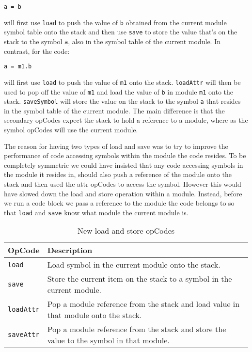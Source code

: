 \begin{lstlisting}
a = b
\end{lstlisting}

will first use {\tt load} to push the value of {\tt b} obtained from the current module symbol table onto the stack and then use {\tt save} to store the value that's on the stack to the symbol {\tt a}, also in the symbol table of the current module. In contrast, for the code:

\begin{lstlisting}
a = m1.b
\end{lstlisting}

will first use {\tt load} to push the value of {\tt m1} onto the stack. {\tt loadAttr} will then be used to pop off the value of {\tt m1} and load the value of {\tt b} in module {\tt m1} onto the stack. {\tt saveSymbol} will store the value on the stack to the symbol {\tt a} that resides in the symbol table of the current module. The main difference is that the secondary opCodes expect the stack to hold a reference to a module, where as the symbol opCodes will use the current module.

The reason for having two types of load and save was to try to improve the performance of code accessing symbols within the module the code resides. To be completely symmetric we could have insisted that any code accessing symbols in the module it resides in, should also push a reference of the module onto the stack and then used the attr opCodes to access the symbol. However this would have slowed down the load and store operation within a module. Instead, before we run a code block we pass a reference to the module the code belongs to so that {\tt load} and {\tt save} know what module the current module is.

\begin{table}
\centering
\begin{tabular}{lp{8.5cm}} \toprule
OpCode & Description \\ \midrule
{\tt load} & Load  symbol in the current module onto the stack. \\
{\tt save} & Store the current item on the stack to a symbol in the current module. \\
{\tt loadAttr} & Pop a module reference from the stack and load value in that module onto the stack. \\
{\tt saveAttr} & Pop a module reference from the stack and store the value to the symbol in that module.  \\ \bottomrule
\end{tabular}
\caption{New load and store opCodes}
\label{tbl:loadstore}
\end{table}

